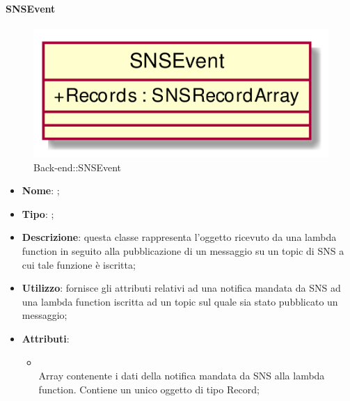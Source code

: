 \hypertarget{SNSEvent_label}{\paragraph{SNSEvent}}
\begin{figure}[h]
	\centering
	\includegraphics[width=\textwidth,height=\textheight,keepaspectratio]{images/ClassSNSEvent.png}
	\caption{Back-end::SNSEvent}
\end{figure}
\begin{itemize}
	\item \textbf{Nome}: ;
	\item \textbf{Tipo}: ;
	\item \textbf{Descrizione}: questa classe rappresenta l'oggetto ricevuto da una lambda function in seguito alla pubblicazione di un messaggio su un topic di SNS a cui tale funzione è iscritta;
	\item \textbf{Utilizzo}: fornisce gli attributi relativi ad una notifica mandata da SNS ad una lambda function iscritta ad un topic sul quale sia stato pubblicato un messaggio;
	\item \textbf{Attributi}:
	\begin{itemize}
		\item[]  \\
		Array contenente i dati della notifica mandata da SNS alla lambda function. Contiene un unico oggetto di tipo Record;
	\end{itemize}
\end{itemize}
\FloatBarrier

